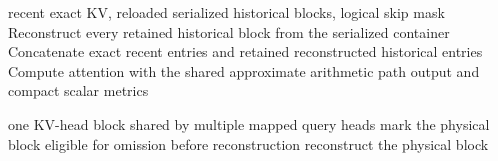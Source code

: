 \begin{algorithm}[h]
\caption{RACK-KV reconstructed attention}
\begin{algorithmic}[1]
\Require recent exact KV, reloaded serialized historical blocks, logical skip mask
\State Reconstruct every retained historical block from the serialized container
\State Concatenate exact recent entries and retained reconstructed historical entries
\State Compute attention with the shared approximate arithmetic path
\State \Return output and compact scalar metrics
\end{algorithmic}
\end{algorithm}

\begin{algorithm}[h]
\caption{Future GQA-aware physical-block eligibility (not yet implemented)}
\begin{algorithmic}[1]
\Require one KV-head block shared by multiple mapped query heads
  \State mark the physical block eligible for omission before reconstruction
\Else
  \State reconstruct the physical block
\EndIf
\end{algorithmic}
\end{algorithm}
